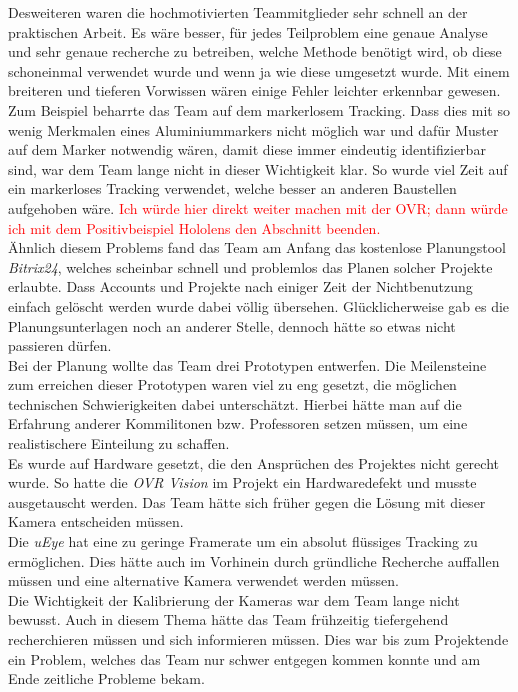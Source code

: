 Desweiteren waren die hochmotivierten Teammitglieder sehr schnell an der praktischen Arbeit. Es wäre besser, für jedes Teilproblem eine genaue Analyse und sehr genaue recherche zu betreiben, welche Methode benötigt wird, ob diese schoneinmal verwendet wurde und wenn ja wie diese umgesetzt wurde. Mit einem breiteren und tieferen Vorwissen wären einige Fehler leichter erkennbar gewesen. Zum Beispiel beharrte das Team auf dem markerlosem Tracking. Dass dies mit so wenig Merkmalen eines Aluminiummarkers nicht möglich war und dafür Muster auf dem Marker notwendig wären, damit diese immer eindeutig identifizierbar sind, war dem Team lange nicht in dieser Wichtigkeit klar. So wurde viel Zeit auf ein markerloses Tracking verwendet, welche besser an anderen Baustellen aufgehoben wäre. \textcolor{red}{Ich würde hier direkt weiter machen mit der OVR; dann würde ich mit dem Positivbeispiel Hololens den Abschnitt beenden.}\\
Ähnlich diesem Problems fand das Team am Anfang das kostenlose Planungstool \textit{Bitrix24}, welches scheinbar schnell und problemlos das Planen solcher Projekte erlaubte. Dass Accounts und Projekte nach einiger Zeit der Nichtbenutzung einfach gelöscht werden wurde dabei völlig übersehen. Glücklicherweise gab es die Planungsunterlagen noch an anderer Stelle, dennoch hätte so etwas nicht passieren dürfen.\\
Bei der Planung wollte das Team drei Prototypen entwerfen. Die Meilensteine zum erreichen dieser Prototypen waren viel zu eng gesetzt, die möglichen technischen Schwierigkeiten dabei unterschätzt. Hierbei hätte man auf die Erfahrung anderer Kommilitonen bzw. Professoren setzen müssen, um eine realistischere Einteilung zu schaffen.\\
Es wurde auf Hardware gesetzt, die den Ansprüchen des Projektes nicht gerecht wurde. So hatte die \textit{OVR Vision} im Projekt ein Hardwaredefekt und musste ausgetauscht werden. Das Team hätte sich früher gegen die Lösung mit dieser Kamera entscheiden müssen.\\
Die \textit{uEye} hat eine zu geringe Framerate um ein absolut flüssiges Tracking zu ermöglichen. Dies hätte auch im Vorhinein durch gründliche Recherche auffallen müssen und eine alternative Kamera verwendet werden müssen.\\
Die Wichtigkeit der Kalibrierung der Kameras war dem Team lange nicht bewusst. Auch in diesem Thema hätte das Team frühzeitig tiefergehend recherchieren müssen und sich informieren müssen. Dies war bis zum Projektende ein Problem, welches das Team nur schwer entgegen kommen konnte und am Ende zeitliche Probleme bekam.\\
